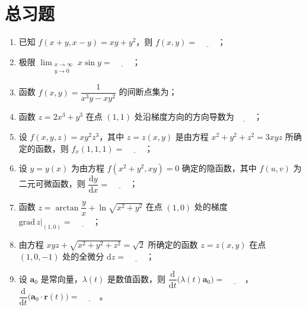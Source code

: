 \documentclass[lang=cn,11pt]{elegantbook}
\begin{document}
\section{总习题}


\begin{exercise}
\begin{enumerate}
  \item 已知 $f(x+y,x-y)=xy+y^2$，则 $f(x,y)=\underline{\hspace{1cm}}$；
  \item 极限 $\displaystyle\lim_{\substack{x\to\infty \\ y\to 0}} x\sin y=\underline{\hspace{1cm}}$；
  \item 函数 $f(x,y)=\dfrac{1}{x^3y-xy^2}$ 的间断点集为\underline{\hspace{1cm}}；
  \item 函数 $z=2x^3+y^3$ 在点 $(1,1)$ 处沿梯度方向的方向导数为$\underline{\hspace{1cm}}$；
  \item 设 $f(x,y,z)=xy^2z^3$，其中 $z=z(x,y)$ 是由方程 $x^2+y^2+z^2=3xyz$ 所确定的函数，则 $f_x(1,1,1)=\underline{\hspace{1cm}}$；
  \item 设 $y=y(x)$ 为由方程 $f(x^2+y^2,xy)=0$ 确定的隐函数，其中 $f(u,v)$ 为二元可微函数，则 $\dfrac{\mathrm{d}y}{\mathrm{d}x}=\underline{\hspace{1cm}}$；
  \item 函数 $z=\arctan\dfrac{y}{x}+\ln\sqrt{x^2+y^2}$ 在点 $(1,0)$ 处的梯度 $\left.\mathrm{grad}\,z\right|_{(1,0)}=\underline{\hspace{1cm}}$；
  \item 由方程 $xyz+\sqrt{x^2+y^2+z^2}=\sqrt{2}$ 所确定的函数 $z=z(x,y)$ 在点 $(1,0,-1)$ 处的全微分 $\mathrm{d}z=\underline{\hspace{1cm}}$；
  \item 设 $\boldsymbol a_0$ 是常向量，$\lambda(t)$ 是数值函数，则 $\dfrac{\mathrm{d}}{\mathrm{d}t}\bigl(\lambda(t)\boldsymbol a_0\bigr)=\underline{\hspace{1cm}}$，$\dfrac{\mathrm{d}}{\mathrm{d}t}\bigl(\boldsymbol a_0\cdot\boldsymbol r(t)\bigr)=\underline{\hspace{1cm}}$。
\end{enumerate}
\end{exercise}
\end{document}
